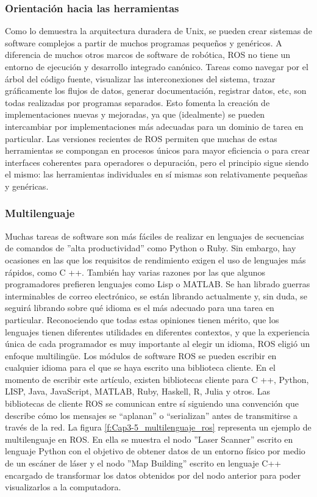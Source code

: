         \subsubsection{Orientación hacia las herramientas}
        
            Como lo demuestra la arquitectura duradera de Unix, se pueden crear sistemas de software complejos a partir de muchos programas pequeños y genéricos. A diferencia de muchos otros marcos de software de robótica, ROS no tiene un entorno de ejecución y desarrollo integrado canónico. Tareas como navegar por el árbol del código fuente, visualizar las interconexiones del sistema, trazar gráficamente los flujos de datos, generar documentación, registrar datos, etc, son todas realizadas por programas separados. Esto fomenta la creación de implementaciones nuevas y mejoradas, ya que (idealmente) se pueden intercambiar por implementaciones más adecuadas para un dominio de tarea en particular. Las versiones recientes de ROS permiten que muchas de estas herramientas se compongan en procesos únicos para mayor eficiencia o para crear interfaces coherentes para operadores o depuración, pero el principio sigue siendo el mismo: las herramientas individuales en sí mismas son relativamente pequeñas y genéricas.
            
        \subsubsection{Multilenguaje}
        
            Muchas tareas de software son más fáciles de realizar en lenguajes de secuencias de comandos de ''alta productividad'' como Python o Ruby. Sin embargo, hay ocasiones en las que los requisitos de rendimiento exigen el uso de lenguajes más rápidos, como C ++. También hay varias razones por las que algunos programadores prefieren lenguajes como Lisp o MATLAB. Se han librado guerras interminables de correo electrónico, se están librando actualmente y, sin duda, se seguirá librando sobre qué idioma es el más adecuado para una tarea en particular. Reconociendo que todas estas opiniones tienen mérito, que los lenguajes tienen diferentes utilidades en diferentes contextos, y que la experiencia única de cada programador es muy importante al elegir un idioma, ROS eligió un enfoque multilingüe. Los módulos de software ROS se pueden escribir en cualquier idioma para el que se haya escrito una biblioteca cliente. En el momento de escribir este artículo, existen bibliotecas cliente para C ++, Python, LISP, Java, JavaScript, MATLAB, Ruby, Haskell, R, Julia y otros. Las bibliotecas de cliente ROS se comunican entre sí siguiendo una convención que describe cómo los mensajes se ``aplanan'' o ``serializan'' antes de transmitirse a través de la red. La figura \ref{f:Cap3-5_multilenguaje_ros} representa un ejemplo de multilenguaje en ROS. En ella se muestra el nodo ''Laser Scanner'' escrito en lenguaje Python con el objetivo de obtener datos de un entorno físico por medio de un escáner de láser y el nodo ''Map Building'' escrito en lenguaje C++ encargado de transformar los datos obtenidos por del nodo anterior para poder visualizarlos a la computadora.     
            
